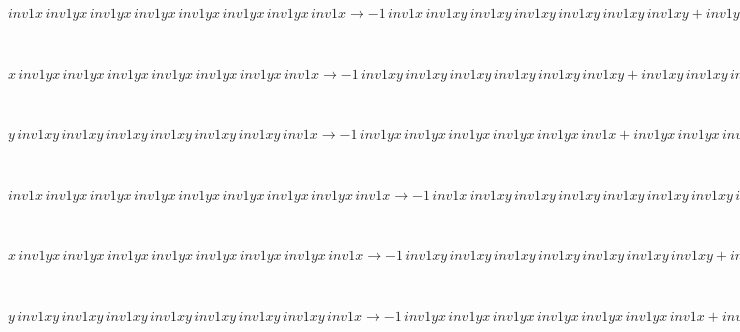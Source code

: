 \documentclass[rep10,leqno]{report}
\begin{document}
\begin{minipage}{6in}
$
inv1x\,
 inv1yx\,
 inv1yx\,
 inv1yx\,
 inv1yx\,
 inv1yx\,
 inv1yx\,
 inv1x\rightarrow -1\,
 inv1x\,
 inv1xy\,
 inv1xy\,
 inv1xy\,
 inv1xy\,
 inv1xy\,
 inv1xy + inv1yx\,
 inv1yx\,
 inv1yx\,
 inv1yx\,
 inv1yx\,
 inv1yx\,
 inv1x + inv1x\,
 inv1xy\,
 inv1xy\,
 inv1xy\,
 inv1xy\,
 inv1xy\,
 inv1xy\,
 inv1x
$
\end{minipage}\medskip \\
\begin{minipage}{6in}
$
x\,
 inv1yx\,
 inv1yx\,
 inv1yx\,
 inv1yx\,
 inv1yx\,
 inv1yx\,
 inv1x\rightarrow -1\,
 inv1xy\,
 inv1xy\,
 inv1xy\,
 inv1xy\,
 inv1xy\,
 inv1xy + inv1xy\,
 inv1xy\,
 inv1xy\,
 inv1xy\,
 inv1xy\,
 inv1xy\,
 inv1x
$
\end{minipage}\medskip \\
\begin{minipage}{6in}
$
y\,
 inv1xy\,
 inv1xy\,
 inv1xy\,
 inv1xy\,
 inv1xy\,
 inv1xy\,
 inv1x\rightarrow -1\,
 inv1yx\,
 inv1yx\,
 inv1yx\,
 inv1yx\,
 inv1yx\,
 inv1x + inv1yx\,
 inv1yx\,
 inv1yx\,
 inv1yx\,
 inv1yx\,
 inv1yx\,
 inv1x + y\,
 inv1xy\,
 inv1xy\,
 inv1xy\,
 inv1xy\,
 inv1xy\,
 inv1xy
$
\end{minipage}\medskip \\
\begin{minipage}{6in}
$
inv1x\,
 inv1yx\,
 inv1yx\,
 inv1yx\,
 inv1yx\,
 inv1yx\,
 inv1yx\,
 inv1yx\,
 inv1x\rightarrow -1\,
 inv1x\,
 inv1xy\,
 inv1xy\,
 inv1xy\,
 inv1xy\,
 inv1xy\,
 inv1xy\,
 inv1xy + inv1yx\,
 inv1yx\,
 inv1yx\,
 inv1yx\,
 inv1yx\,
 inv1yx\,
 inv1yx\,
 inv1x + inv1x\,
 inv1xy\,
 inv1xy\,
 inv1xy\,
 inv1xy\,
 inv1xy\,
 inv1xy\,
 inv1xy\,
 inv1x
$
\end{minipage}\medskip \\
\begin{minipage}{6in}
$
x\,
 inv1yx\,
 inv1yx\,
 inv1yx\,
 inv1yx\,
 inv1yx\,
 inv1yx\,
 inv1yx\,
 inv1x\rightarrow -1\,
 inv1xy\,
 inv1xy\,
 inv1xy\,
 inv1xy\,
 inv1xy\,
 inv1xy\,
 inv1xy + inv1xy\,
 inv1xy\,
 inv1xy\,
 inv1xy\,
 inv1xy\,
 inv1xy\,
 inv1xy\,
 inv1x
$
\end{minipage}\medskip \\
\begin{minipage}{6in}
$
y\,
 inv1xy\,
 inv1xy\,
 inv1xy\,
 inv1xy\,
 inv1xy\,
 inv1xy\,
 inv1xy\,
 inv1x\rightarrow -1\,
 inv1yx\,
 inv1yx\,
 inv1yx\,
 inv1yx\,
 inv1yx\,
 inv1yx\,
 inv1x + inv1yx\,
 inv1yx\,
 inv1yx\,
 inv1yx\,
 inv1yx\,
 inv1yx\,
 inv1yx\,
 inv1x + y\,
 inv1xy\,
 inv1xy\,
 inv1xy\,
 inv1xy\,
 inv1xy\,
 inv1xy\,
 inv1xy
$
\end{minipage}\medskip \\
\end{document}

